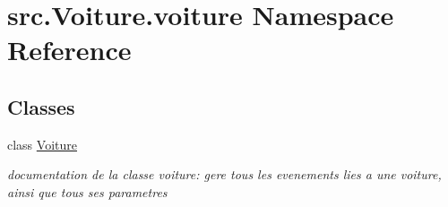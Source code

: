 \hypertarget{namespacesrc_1_1_voiture_1_1voiture}{}\section{src.\+Voiture.\+voiture Namespace Reference}
\label{namespacesrc_1_1_voiture_1_1voiture}
\subsection*{Classes}
\begin{DoxyCompactItemize}
\item 
class \hyperlink{classsrc_1_1_voiture_1_1voiture_1_1_voiture}{Voiture}
\begin{DoxyCompactList}\small\item\em documentation de la classe voiture\+: gere tous les evenements lies a une voiture, ainsi que tous ses parametres \end{DoxyCompactList}\end{DoxyCompactItemize}
